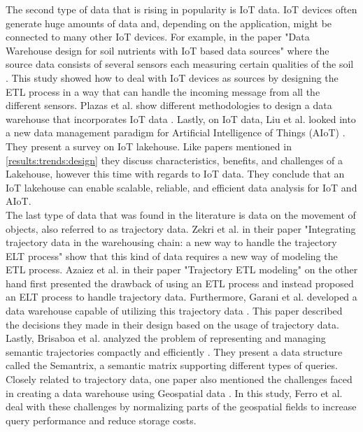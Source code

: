 \documentclass[11pt]{article}
\begin{document}
The second type of data that is rising in popularity is IoT data. IoT devices often generate huge amounts of data and, depending on the application, might be connected to many other IoT devices. For example, in the paper "Data Warehouse design for soil nutrients with IoT based data sources" where the source data consists of several sensors each measuring certain qualities of the soil \cite{Rahman2019181}. This study showed how to deal with IoT devices as sources by designing the ETL process in a way that can handle the incoming message from all the different sensors. Plazas et al. show different methodologies to design a data warehouse that incorporates IoT data \cite{Plazas202084}. Lastly, on IoT data, Liu et al. looked into a new data management paradigm for Artificial Intelligence of Things (AIoT) \cite{Liu202334}. They present a survey on IoT lakehouse. Like papers mentioned in \ref{results:trends:design} they discuss characteristics, benefits, and challenges of a Lakehouse, however this time with regards to IoT data. They conclude that an IoT lakehouse can enable scalable, reliable, and efficient data analysis for IoT and AIoT. \\

The last type of data that was found in the literature is data on the movement of objects, also referred to as trajectory data. Zekri et al. in their paper "Integrating trajectory data in the warehousing chain: a new way to handle the trajectory ELT process" \cite{Zekri2018380} show that this kind of data requires a new way of modeling the ETL process. Azaiez et al. in their paper "Trajectory ETL modeling" \cite{Azaiez2018353} on the other hand first presented the drawback of using an ETL process and instead proposed an ELT process to handle trajectory data. Furthermore, Garani et al. developed a data warehouse capable of utilizing this trajectory data \cite{Garani202388}. This paper described the decisions they made in their design based on the usage of trajectory data. Lastly, Brisaboa et al. analyzed the problem of representing and managing semantic trajectories compactly and efficiently \cite{RodriguezBrisaboa2020113}. They present a data structure called the Semantrix, a semantic matrix supporting different types of queries.\\

Closely related to trajectory data, one paper also mentioned the challenges faced in creating a data warehouse using Geospatial data \cite{Ferro2019221}. In this study, Ferro et al. deal with these challenges by normalizing parts of the geospatial fields to increase query performance and reduce storage costs.\\
\end{document}
